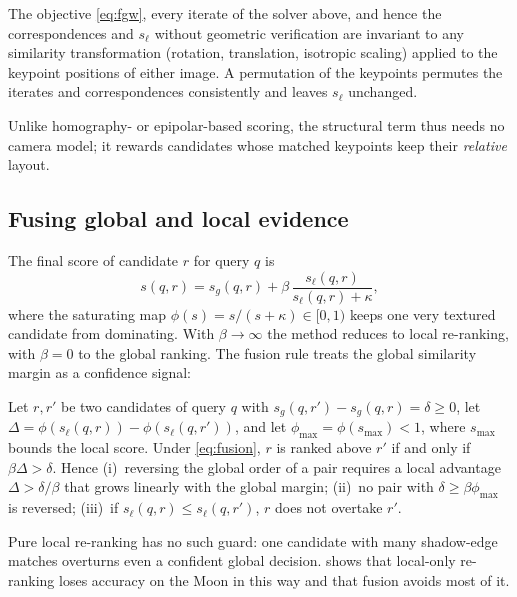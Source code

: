 \begin{proposition}\label{prop:inv}
The objective \eqref{eq:fgw}, every iterate of the solver above, and hence the correspondences and
$s_\ell$ without geometric verification are invariant to any similarity transformation (rotation,
translation, isotropic scaling) applied to the keypoint positions of either image. A permutation of
the keypoints permutes the iterates and correspondences consistently and leaves $s_\ell$ unchanged.
\end{proposition}
Unlike homography- or epipolar-based scoring, the structural term thus needs no camera model; it
rewards candidates whose matched keypoints keep their \emph{relative} layout.

\subsection{Fusing global and local evidence}\label{sec:fusion}
The final score of candidate $r$ for query $q$ is
\begin{equation}
s(q,r)=s_g(q,r)+\beta\,\frac{s_\ell(q,r)}{s_\ell(q,r)+\kappa},
\label{eq:fusion}
\end{equation}
where the saturating map $\phi(s)=s/(s+\kappa)\in[0,1)$ keeps one very textured candidate from
dominating. With $\beta\to\infty$ the method reduces to local re-ranking, with $\beta=0$ to the
global ranking. The fusion rule
treats the global similarity margin as a confidence signal:

\begin{proposition}\label{prop:override}
Let $r,r'$ be two candidates of query $q$ with $s_g(q,r')-s_g(q,r)=\delta\ge0$, let
$\Delta=\phi(s_\ell(q,r))-\phi(s_\ell(q,r'))$, and let $\phi_{\max}=\phi(s_{\max})<1$, where $s_{\max}$
bounds the local score. Under \eqref{eq:fusion}, $r$ is ranked above $r'$ if and only if
$\beta\Delta>\delta$. Hence (i)~reversing the global order of a pair requires a local advantage
$\Delta>\delta/\beta$ that grows linearly with the global margin; (ii)~no pair with
$\delta\ge\beta\phi_{\max}$ is reversed; (iii)~if $s_\ell(q,r)\le s_\ell(q,r')$, $r$ does not
overtake $r'$.
\end{proposition}
Pure local re-ranking has no such guard: one candidate with many shadow-edge matches overturns even a
confident global decision.  shows that local-only re-ranking loses accuracy on the
Moon in this way and that fusion avoids most of it.
